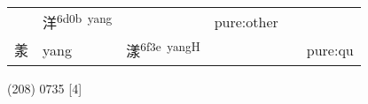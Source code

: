 \documentclass[14pt,a4paper]{scrartcl}
\begin{document}
\begin{longtable}[c]{@{}llllll@{}}
\begin{minipage}[t]{0.14\columnwidth}\raggedright\strut
\strut\end{minipage} &
\begin{minipage}[t]{0.14\columnwidth}\raggedright\strut
洋\textsuperscript{6d0b~yang}
\strut\end{minipage} &
\begin{minipage}[t]{0.14\columnwidth}\raggedright\strut
\strut\end{minipage} &
\begin{minipage}[t]{0.14\columnwidth}\raggedright\strut
pure:other
\strut\end{minipage}\tabularnewline
\begin{minipage}[t]{0.14\columnwidth}\raggedright\strut
羕
\strut\end{minipage} &
\begin{minipage}[t]{0.14\columnwidth}\raggedright\strut
yang
\strut\end{minipage} &
\begin{minipage}[t]{0.14\columnwidth}\raggedright\strut
漾\textsuperscript{6f3e~yangH}
\strut\end{minipage} &
\begin{minipage}[t]{0.14\columnwidth}\raggedright\strut
\strut\end{minipage} &
\begin{minipage}[t]{0.14\columnwidth}\raggedright\strut
\strut\end{minipage} &
\begin{minipage}[t]{0.14\columnwidth}\raggedright\strut
pure:qu
\strut\end{minipage}\tabularnewline
\bottomrule
\end{longtable}

(208) 0735 {[}4{]}
\end{document}
